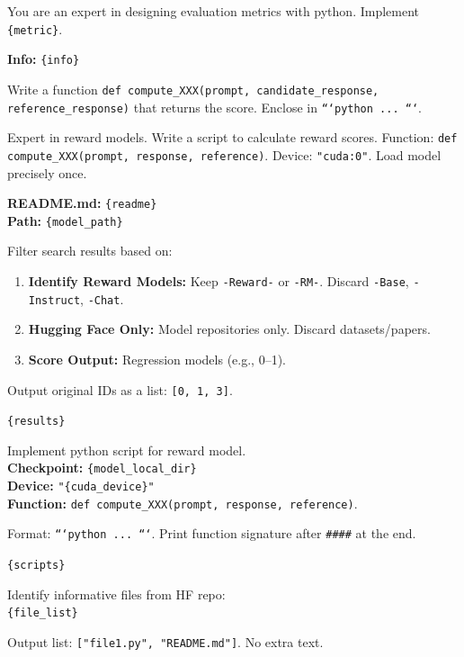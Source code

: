 \begin{tcolorbox}[title={\texttt{METRIC\_DESIGN\_PROMPT}}, breakable, colframe=blue!50!black, colback=blue!5]
You are an expert in designing evaluation metrics with python. Implement \texttt{\{metric\}}. 

\textbf{Info:} \texttt{\{info\}}

Write a function \texttt{def compute\_XXX(prompt, candidate\_response, reference\_response)} that returns the score. Enclose in \texttt{```python ... ```}.
\end{tcolorbox}

\begin{tcolorbox}[title={\texttt{REWARD\_MODEL\_DESIGN\_PROMPT}}, breakable, colframe=blue!50!black, colback=blue!5]
Expert in reward models. Write a script to calculate reward scores. 
Function: \texttt{def compute\_XXX(prompt, response, reference)}. 
Device: \texttt{"cuda:0"}. Load model precisely once.

\textbf{README.md:} \texttt{\{readme\}} \\
\textbf{Path:} \texttt{\{model\_path\}}
\end{tcolorbox}

\begin{tcolorbox}[title={\texttt{RERANK\_PROMPT}}, breakable, colframe=blue!50!black, colback=blue!5]
Filter search results based on:
\begin{enumerate}
    \item \textbf{Identify Reward Models:} Keep \texttt{-Reward-} or \texttt{-RM-}. Discard \texttt{-Base}, \texttt{-Instruct}, \texttt{-Chat}.
    \item \textbf{Hugging Face Only:} Model repositories only. Discard datasets/papers.
    \item \textbf{Score Output:} Regression models (e.g., 0--1).
\end{enumerate}
Output original IDs as a list: \texttt{[0, 1, 3]}.

\medskip
\texttt{\{results\}}
\end{tcolorbox}

\begin{tcolorbox}[title={\texttt{LLMRM\_IMPLEMENT\_CODE}}, breakable, colframe=blue!50!black, colback=blue!5]
Implement python script for reward model. \\
\textbf{Checkpoint:} \texttt{\{model\_local\_dir\}} \\
\textbf{Device:} \texttt{"\{cuda\_device\}"} \\
\textbf{Function:} \texttt{def compute\_XXX(prompt, response, reference)}.

Format: \texttt{```python ... ```}. Print function signature after \texttt{\#\#\#\#} at the end.

\medskip
\texttt{\{scripts\}}
\end{tcolorbox}

\begin{tcolorbox}[title={\texttt{SELECT\_INFORMATIVE\_FILES}}, breakable, colframe=blue!50!black, colback=blue!5]
Identify informative files from HF repo: \\
\texttt{\{file\_list\}}

Output list: \texttt{["file1.py", "README.md"]}. No extra text.
\end{tcolorbox}